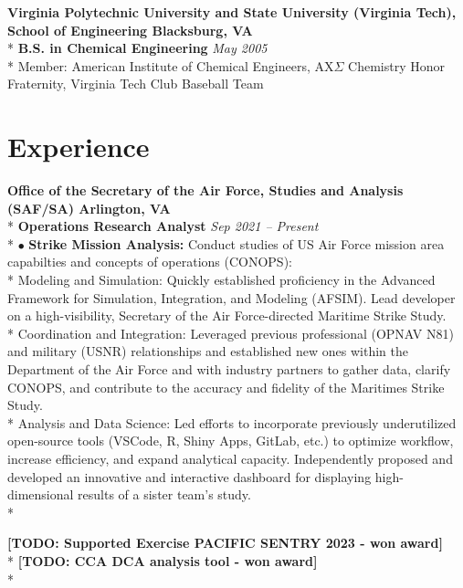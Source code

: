 \documentclass{article}
\begin{document}
\noindent \textbf{Virginia Polytechnic University and State University (Virginia Tech), School of Engineering \hfill Blacksburg, VA} \\*
\textbf{B.S. in Chemical Engineering} \hfill \textit{May 2005} \\*
\textendash Member: American Institute of Chemical Engineers, AX$\Sigma$ Chemistry Honor Fraternity, Virginia Tech Club Baseball Team 

\section{Experience}
\noindent \textbf{Office of the Secretary of the Air Force, Studies and Analysis (SAF/SA) \hfill Arlington, VA} \\*
\textbf{Operations Research Analyst} \hfill \textit{Sep 2021 -- Present} \\*
$\bullet$ \textbf{Strike Mission Analysis:} Conduct studies of US Air Force mission area capabilties and concepts of operations (CONOPS):\\*
\indent \textendash Modeling and Simulation: Quickly established proficiency in the Advanced Framework for Simulation, Integration, and Modeling (AFSIM). Lead developer on a high-visibility, Secretary of the Air Force-directed Maritime Strike Study. \\*
\indent \textendash Coordination and Integration: Leveraged previous professional (OPNAV N81) and military (USNR) relationships and established new ones within the Department of the Air Force and with industry partners to gather data, clarify CONOPS, and contribute to the accuracy and fidelity of the Maritimes Strike Study. \\*
\indent \textendash Analysis and Data Science: Led efforts to incorporate previously underutilized open-source tools (VSCode, R, Shiny Apps, GitLab, etc.) to optimize workflow, increase efficiency, and expand analytical capacity. Independently proposed and developed an innovative and interactive dashboard for displaying high-dimensional results of a sister team's study. \\*

\noindent \textbf{[TODO: Supported Exercise PACIFIC SENTRY 2023 - won award]} \\*
\noindent \textbf{[TODO: CCA DCA analysis tool - won award]} \\*
\end{document}
